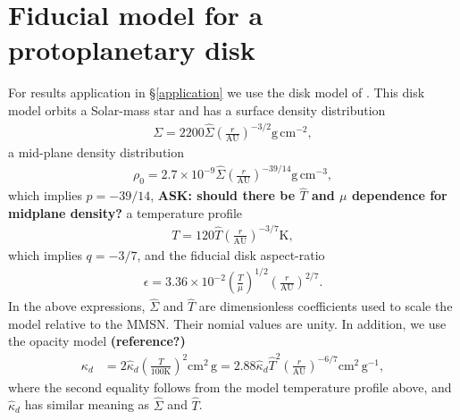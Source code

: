 \section{Fiducial model for a protoplanetary disk}\label{mmsn}
For results application in \S\ref{application} we use the disk model
of \cite{chiang10}. This disk model orbits a Solar-mass star and 
has a surface density distribution
\begin{align}\label{mmsn_sigma}
  \Sigma = 2200
  \hat{\Sigma}\left(\frac{r}{\mathrm{AU}}\right)^{-3/2}\mathrm{g}\,\mathrm{cm}^{-2},  
\end{align}
a mid-plane density distribution
\begin{align}
  \rho_0 = 2.7\times10^{-9}
  \hat{\Sigma}\left(\frac{r}{\mathrm{AU}}\right)^{-39/14}\mathrm{g}\,\mathrm{cm}^{-3},  
\end{align}
which implies $p=-39/14$, {\bf ASK: should there be $\hat{T}$ and $\mu$ dependence for midplane density?}
a temperature profile
\begin{align}\label{mmsn_temp}
  T = 120\hat{T}\left(\frac{r}{\mathrm{AU}}\right)^{-3/7} \mathrm{K},
\end{align}
which implies $q=-3/7$, 
and the fiducial disk aspect-ratio 
\begin{align}\label{mmsn_epsilon}
  \epsilon = 3.36\times10^{-2}\left(\frac{\hat{T}}{\mu}\right)^{1/2}\left(\frac{r}{\mathrm{AU}}\right)^{2/7}.
\end{align}
In the above expressions, $\hat{\Sigma}$ and
$\hat{T}$ are dimensionless coefficients used to scale the model
relative to the MMSN. Their nomial values are unity. In addition, we
use the opacity model {\bf(reference?)}
 \begin{align}
   \kappa_d &= 2 \hat{\kappa}_d \left(\frac{T}{100\mathrm{K}}\right)^2
   \mathrm{cm}^2\,\mathrm{g}
    =
   2.88\hat{\kappa}_d\hat{T}^2\left(\frac{r}{\mathrm{AU}}\right)^{-6/7}\mathrm{cm}^2\,\mathrm{g}^{-1},   
 \end{align}
where the second equality follows from the model temperature profile
above, and $\hat{\kappa}_d$ has similar meaning as $\hat{\Sigma}$ and
$\hat{T}$. 
